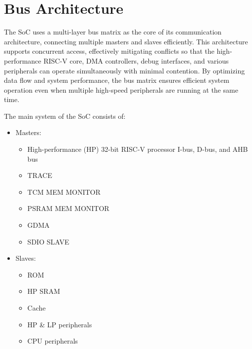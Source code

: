 \documentclass[main\_\_EN.tex]{subfiles}
\begin{document}
\setenglishformatting

\ifglobal
\else
    \clearpage
    \listoftodos
    \listofdonetodos
    \tableofcontents
\fi



\hypertarget{busarch}{}
\chapter{Bus Architecture}
\label{mod:busarch}

The \chipname{} SoC uses a multi-layer bus matrix as the core of its communication architecture, connecting multiple masters and slaves efficiently. This architecture supports concurrent access, effectively mitigating conflicts so that the high-performance RISC-V core, DMA controllers, debug interfaces, and various peripherals can operate simultaneously with minimal contention. By optimizing data flow and system performance, the bus matrix ensures efficient system operation even when multiple high-speed peripherals are running at the same time.

The main system of the \chipname{} SoC consists of:

\begin{itemize}
    \item Masters:
        \begin{itemize}
            \item High-performance (HP) 32-bit RISC-V processor I-bus, D-bus, and AHB bus
            \item TRACE
            \item TCM MEM MONITOR
            \item PSRAM MEM MONITOR
            \item GDMA
            \item SDIO SLAVE
        \end{itemize}
    \item Slaves:
        \begin{itemize}
            \item ROM
            \item HP SRAM
            \item Cache
            \item HP \& LP peripherals
            \item CPU peripherals
        \end{itemize}
\end{itemize}
\end{document}
